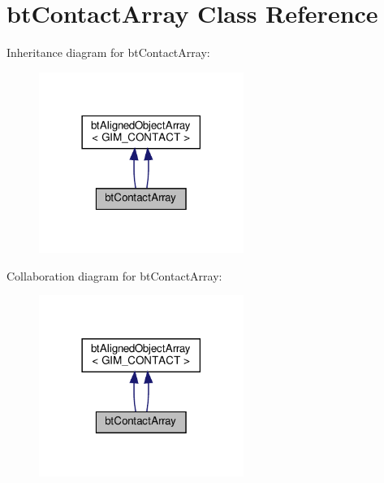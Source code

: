 \hypertarget{classbtContactArray}{}\section{bt\+Contact\+Array Class Reference}
\label{classbtContactArray}


Inheritance diagram for bt\+Contact\+Array\+:
\nopagebreak
\begin{figure}[H]
\begin{center}
\leavevmode
\includegraphics[width=189pt]{classbtContactArray__inherit__graph}
\end{center}
\end{figure}


Collaboration diagram for bt\+Contact\+Array\+:
\nopagebreak
\begin{figure}[H]
\begin{center}
\leavevmode
\includegraphics[width=189pt]{classbtContactArray__coll__graph}
\end{center}
\end{figure}
